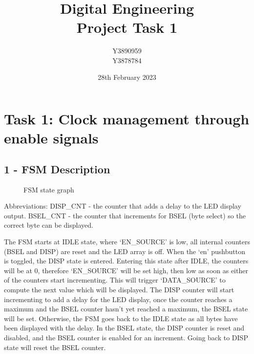 \documentclass[11pt]{report}
\title{Digital Engineering\\Project Task 1}
\author{Y3890959\\Y3878784}
\date{28th February 2023}
\begin{document}
\maketitle

\chapter*{Task 1: Clock management through enable signals}

\section*{1 - FSM Description}

\begin{figure}[h] %
    \centering %
    \caption{FSM state graph}
    \label{fig:my_label}
\end{figure}

Abbreviations: DISP\_CNT - the counter that adds a delay to the LED display output. BSEL\_CNT - the counter
that increments for BSEL (byte select) so the correct byte can be displayed.

The FSM starts at IDLE state, where `EN\_SOURCE' is low, all internal counters (BSEL and DISP) are reset and
the LED array is off. When the `en' pushbutton is toggled, the DISP state is entered. Entering this state
after IDLE, the counters will be at 0, therefore `EN\_SOURCE' will be set high, then low as soon as either of
the counters start incrementing. This will trigger `DATA\_SOURCE' to compute the next value which will be
displayed. The DISP counter will start incrementing to add a delay for the LED display, once the counter
reaches a maximum and the BSEL counter hasn't yet reached a maximum, the BSEL state will be set. Otherwise,
the FSM goes back to the IDLE state as all bytes have been displayed with the delay. In the BSEL state, the
DISP counter is reset and disabled, and the BSEL counter is enabled for an increment. Going back to DISP state
will reset the BSEL counter.
\end{document}
